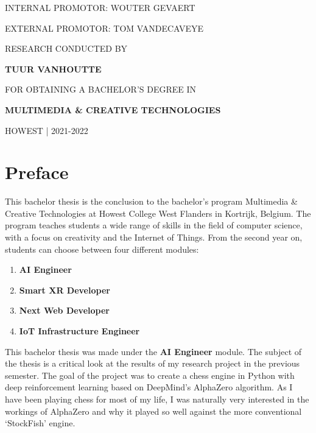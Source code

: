 \documentclass{article}
\begin{document}
\begin{titlepage}
\begin{adjustwidth}{1.5cm}{1.5cm}
    \MakeUppercase{Internal promotor: Wouter Gevaert}

    \MakeUppercase{External promotor: Tom Vandecaveye}

    \vspace{1em}

    \MakeUppercase{\small{Research conducted by}}

    \MakeUppercase{\Large\textbf{{Tuur Vanhoutte}}}

    \MakeUppercase{\small{for obtaining a bachelor's degree in}}

    \MakeUppercase{\Large{\textbf{{Multimedia \& Creative Technologies}}}}

    \MakeUppercase{Howest | 2021-2022}
    \end{adjustwidth}
\end{titlepage}


\newpage
\thispagestyle{empty}
\mbox{}
\newpage

\thispagestyle{empty}
\section*{Preface}

This bachelor thesis is the conclusion to the bachelor's program Multimedia \& Creative Technologies at Howest College
West Flanders in Kortrijk, Belgium. The program teaches students a wide range of skills in the field of 
computer science, with a focus on creativity and the Internet of Things. From the second year on, students can choose 
between four different modules:

\begin{enumerate}
    \item \textbf{AI Engineer}
    \item \textbf{Smart XR Developer}
    \item \textbf{Next Web Developer}
    \item \textbf{IoT Infrastructure Engineer}
\end{enumerate}

This bachelor thesis was made under the \textbf{AI Engineer} module.
The subject of the thesis is a critical look at the results of my research project 
in the previous semester. The goal of the project was to create a chess engine in Python with
deep reinforcement learning based on DeepMind's AlphaZero algorithm. 
As I have been playing chess for most of my life, I was naturally very interested in the workings of AlphaZero
and why it played so well against the more conventional `StockFish' engine. 
\end{document}

